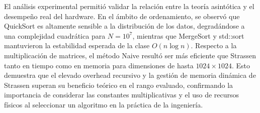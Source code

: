 \begin{mdframed}
    El análisis experimental permitió validar la relación entre la teoría asintótica y el desempeño real del hardware. En el ámbito de ordenamiento, se observó que QuickSort es altamente sensible a la distribución de los datos, degradándose a una complejidad cuadrática para $N=10^7$, mientras que MergeSort y std::sort mantuvieron la estabilidad esperada de la clase $O(n \log n)$. 
    Respecto a la multiplicación de matrices, el método Naive resultó ser más eficiente que Strassen tanto en tiempo como en memoria para dimensiones de hasta $1024 \times 1024$. Esto demuestra que el elevado overhead recursivo y la gestión de memoria dinámica de Strassen superan su beneficio teórico en el rango evaluado, confirmando la importancia de considerar las constantes multiplicativas y el uso de recursos físicos al seleccionar un algoritmo en la práctica de la ingeniería.
\end{mdframed}
